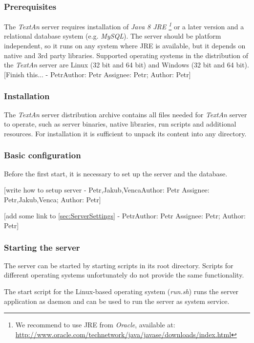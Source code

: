\documentclass[12pt,a4paper]{report}
\makeatletter
\newcommand{\comment}[3][\@empty]{
  {\color{magenta}[#3 - }
  {\color{green}\ifx\@empty#1\relax Author: #2 \else Assignee: #1; Author: #2\fi}{\color{magenta}]}
}
\newcommand{\textan}{\emph{TextAn}}
\makeatother
\begin{document}
\subsubsection{Prerequisites}
\label{sssec:SerInstPre}

The \textan{} server requires installation of \emph{Java 8 JRE
\footnote{We recommend to use JRE from \emph{Oracle}, available at: \url{http://www.oracle.com/technetwork/java/javase/downloads/index.html}}}
or a later version and a relational database system (e.g. \emph{MySQL}).
The server should be platform independent, so it runs on any system where JRE is available,
but it depends on native and 3rd party libraries. 
Supported operating systems in the distribution of the \textan{} server are
Linux (32 bit and 64 bit) and Windows (32 bit and 64 bit). \comment[Petr]{Petr}{Finish this...}

\subsubsection{Installation}

The \textan{} server distribution archive contains all files needed for \textan{} server to operate,
such as server binaries, native libraries, run scripts and additional resources.
For installation it is sufficient to unpack its content into any directory.

\subsubsection{Basic configuration}

Before the first start, it is necessary to set up the server and the database.

\comment[Petr,Jakub,Venca]{Petr}{write how to setup server}

\comment[Petr]{Petr}{add some link to \ref{sec:ServerSettings}}

\subsubsection{Starting the server}

The server can be started by starting scripts in its root directory. 
Scripts for different operating systems unfortunately do not provide the same functionality.

The start script for the Linux-based operating system (\emph{run.sh}) runs the server application as daemon
and can be used to run the server as system service.
\end{document}
